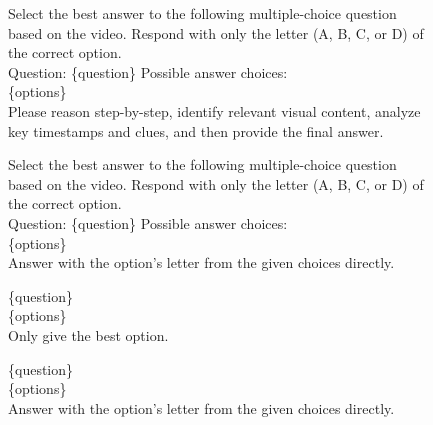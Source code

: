 \documentclass{llmxive}
\begin{document}
\begin{figure}[h]
\begin{tcolorbox}[colback=black!7.5!white, colframe=black!80!white, title=Video-MME\space \textbar\space MVBench -- For Qwen series thinking models, fontupper=\footnotesize, fontlower=\footnotesize, fonttitle=\footnotesize]

Select the best answer to the following multiple-choice question based on the video.
Respond with only the letter (A, B, C, or D) of the correct option.\\
Question: \{question\} Possible answer choices:\\
\{options\}\\
Please reason step-by-step, identify relevant visual content, analyze key timestamps and
clues, and then provide the final answer.
\end{tcolorbox}

\end{figure}

\begin{figure}[h]
\begin{tcolorbox}[colback=black!7.5!white, colframe=black!80!white, title=Video-MME -- For other models, fontupper=\footnotesize, fontlower=\footnotesize, fonttitle=\footnotesize]

Select the best answer to the following multiple-choice question based on the video.
Respond with only the letter (A, B, C, or D) of the correct option.\\
Question: \{question\} Possible answer choices:\\
\{options\}\\
Answer with the option's letter from the given choices directly.
\end{tcolorbox}
\end{figure}

\begin{figure}[h]
\begin{tcolorbox}[colback=black!7.5!white, colframe=black!80!white, title=MVBench -- For other models, fontupper=\footnotesize, fontlower=\footnotesize, fonttitle=\footnotesize]

\{question\}\\
\{options\}\\
Only give the best option.
\end{tcolorbox}
\end{figure}


\begin{figure}[h]
\begin{tcolorbox}[colback=black!7.5!white, colframe=black!80!white, title=LongVideoBench -- For other models, fontupper=\footnotesize, fontlower=\footnotesize, fonttitle=\footnotesize]
\{question\}\\
\{options\}\\
Answer with the option's letter from the given choices directly.
\end{tcolorbox}
\end{figure}
\end{document}
